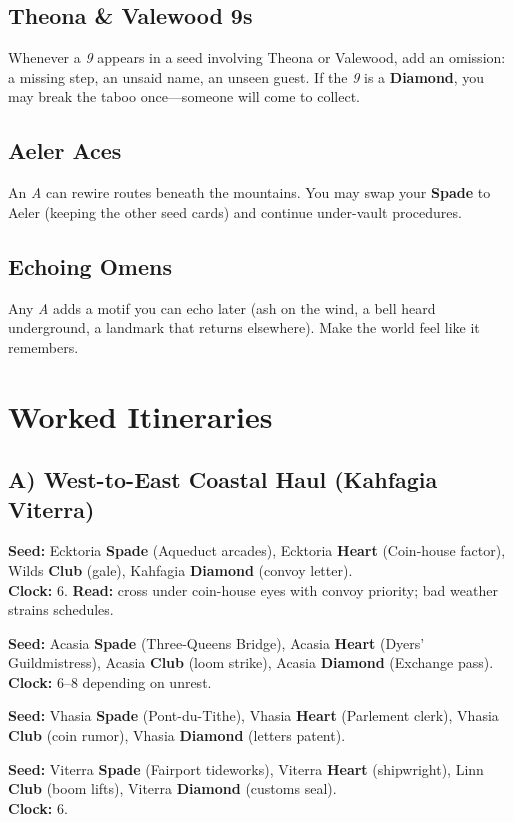 \documentclass[11pt]{article}
\newcommand{\SuitSpade}{\textbf{Spade}} %
\newcommand{\SuitHeart}{\textbf{Heart}} %
\newcommand{\SuitClub}{\textbf{Club}}   %
\newcommand{\SuitDiamond}{\textbf{Diamond}} %
\newenvironment{Leg}[1]{\begin{tcolorbox}[enhanced,breakable,sharp corners,boxrule=.6pt, colback=white,colframe=black,title={#1}]}{\end{tcolorbox}}
\begin{document}
\subsection*{Theona & Valewood 9s}
Whenever a \emph{9} appears in a seed involving Theona or Valewood, add an omission: a missing step, an unsaid name, an unseen guest. If the \emph{9} is a \SuitDiamond{}, you may break the taboo once---someone will come to collect.

\subsection*{Aeler Aces}
An \emph{A} can rewire routes beneath the mountains. You may swap your \SuitSpade{} to Aeler (keeping the other seed cards) and continue under-vault procedures.

\subsection*{Echoing Omens}
Any \emph{A} adds a motif you can echo later (ash on the wind, a bell heard underground, a landmark that returns elsewhere). Make the world feel like it remembers.

\section{Worked Itineraries}
\subsection*{A) West-to-East Coastal Haul (Kahfagia \textrightarrow{} Viterra)}
\begin{Leg}{Leg 1: Qeresh-on-Sea \textrightarrow{} Ecktoria}
\textbf{Seed:} Ecktoria \SuitSpade{} (Aqueduct arcades), Ecktoria \SuitHeart{} (Coin-house factor), Wilds \SuitClub{} (gale), Kahfagia \SuitDiamond{} (convoy letter).\\
\textbf{Clock:} 6. \textbf{Read:} cross under coin-house eyes with convoy priority; bad weather strains schedules.
\end{Leg}
\begin{Leg}{Leg 2: Ecktoria \textrightarrow{} Silkstrand}
\textbf{Seed:} Acasia \SuitSpade{} (Three-Queens Bridge), Acasia \SuitHeart{} (Dyers' Guildmistress), Acasia \SuitClub{} (loom strike), Acasia \SuitDiamond{} (Exchange pass).\\
\textbf{Clock:} 6--8 depending on unrest.
\end{Leg}
\begin{Leg}{Leg 3: Silkstrand \textrightarrow{} Marcott}
\textbf{Seed:} Vhasia \SuitSpade{} (Pont-du-Tithe), Vhasia \SuitHeart{} (Parlement clerk), Vhasia \SuitClub{} (coin rumor), Vhasia \SuitDiamond{} (letters patent).
\end{Leg}
\begin{Leg}{Leg 4: Marcott \textrightarrow{} Fairport}
\textbf{Seed:} Viterra \SuitSpade{} (Fairport tideworks), Viterra \SuitHeart{} (shipwright), Linn \SuitClub{} (boom lifts), Viterra \SuitDiamond{} (customs seal).\\
\textbf{Clock:} 6.
\end{Leg}
\end{document}
